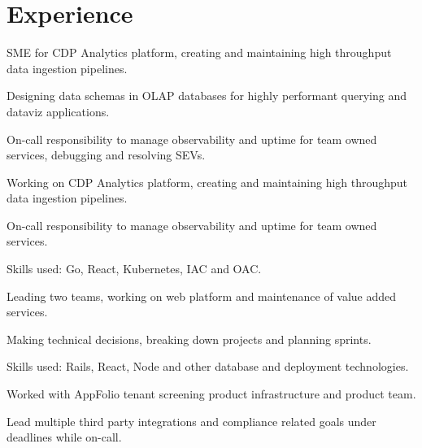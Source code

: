 \section{Experience}

    \begin{tightemize}
      \item SME for CDP Analytics platform, creating and maintaining high throughput data ingestion pipelines.
      \item Designing data schemas in OLAP databases for highly performant querying and dataviz applications.
      \item On-call responsibility to manage observability and uptime for team owned services, debugging and resolving SEVs.
    \end{tightemize}
    \sectionsep

    \begin{tightemize}
      \item Working on CDP Analytics platform, creating and maintaining high throughput data ingestion pipelines.
      \item On-call responsibility to manage observability and uptime for team owned services.
      \item Skills used: Go, React, Kubernetes, IAC and OAC.
    \end{tightemize} 
    \sectionsep

    \begin{tightemize}
      \item Leading two teams, working on web platform and maintenance of value added services.
      \item Making technical decisions, breaking down projects and planning sprints.
      \item Skills used: Rails, React, Node and other database and deployment technologies.
    \end{tightemize} 
    \sectionsep

    \begin{tightemize}
      \item Worked with AppFolio tenant screening product infrastructure and product team.
      \item Lead multiple third party integrations and compliance related goals under deadlines while on-call.
    \end{tightemize} 
    \sectionsep

